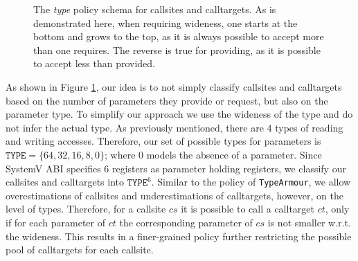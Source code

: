 \begin{figure}[!h]
{
}
\caption{The \emph{type} policy schema for callsites and calltargets. As is demonstrated here, when requiring wideness, one starts at the bottom and grows to the 
top, as it is always possible to accept more than one requires. The reverse is true for providing, as it is possible to accept less than provided.}
\label{fig:TYPEschema}
\end{figure}
As shown in Figure \ref{fig:TYPEschema}, our idea is to not simply classify callsites and calltargets based on the number of parameters they provide or 
request, but also on the parameter type. To simplify our approach we use the wideness of the type and do not infer the actual type.
As previously mentioned, there are 4 types of reading and writing accesses. Therefore, our set of possible types for parameters is $\texttt{TYPE} = \{64, 32, 16, 8, 0\}$; 
where 0 models the absence of a parameter. Since SystemV ABI specifies 6 registers as parameter holding 
registers, we classify our callsites and calltargets into $\texttt{TYPE}^6$.
Similar to the policy of \texttt{TypeArmour}, we allow overestimations of callsites and underestimations of calltargets, however, on the level of types. Therefore, for a 
callsite $cs$ it is possible to call a calltarget $ct$, only if for each parameter of $ct$ the corresponding parameter of $cs$ is not smaller w.r.t. the wideness.
This results in a finer-grained policy further restricting the possible pool of calltargets for each callsite.



